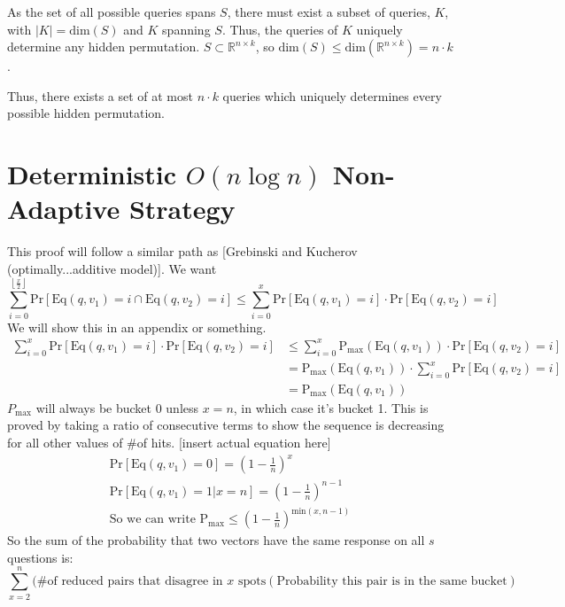 \documentclass[12pt, a4paper]{article}
\begin{document}
As the set of all possible queries spans $S$, there must exist a subset of queries,
$K$, with $|K|=\text{dim}(S)$ and $K$ spanning $S$. Thus, the queries of $K$ uniquely
determine any hidden permutation. $S\subset \mathbb{R}^{n\times k}$,
so $\text{dim}(S)\le \text{dim}(\mathbb{R}^{n\times k})=n\cdot k$.

Thus, there exists a set of at most $n\cdot k$ queries which uniquely determines every
possible hidden permutation.

\clearpage
\section*{Deterministic $O(n\log n)$ Non-Adaptive Strategy}
This proof will follow a similar path as [Grebinski and Kucherov
(optimally...additive model)].
We want 
	\begin{equation*}
	\sum_{i=0}^{\left\lfloor\frac{x}{2}\right\rfloor}\text{Pr}[\text{Eq}(q,v_1)=i
	\cap\text{Eq}(q,v_2) = i]\leq \sum_{i=0}^x\text{Pr}[\text{Eq}(q,v_1) = i]
	\cdot\text{Pr}[\text{Eq}(q,v_2) = i]
	\end{equation*}
We will show this in an appendix or something.
	\begin{align*}
	\sum_{i=0}^x\text{Pr}[\text{Eq}(q,v_1) = i]
	\cdot\text{Pr}[ \text{Eq}(q,v_2) = i]
	& \le \sum_{i=0}^x\text{P}_\text{max}(\text{Eq}(q,v_1))
	\cdot\text{Pr}[ \text{Eq}(q,v_2) = i] \\
	&= \text{P}_\text{max}(\text{Eq}(q,v_1))
	\cdot \sum_{i=0}^x\text{Pr}[ \text{Eq}(q,v_2) = i] \\
	&= \text{P}_\text{max}(\text{Eq}(q,v_1))
	\end{align*}
$P_\text{max}$ will always be bucket 0 unless $x=n$, in which case it's
bucket 1. This is proved by taking a ratio of consecutive terms to show the sequence
is decreasing for all other values of \#of hits. [insert actual equation here]
	\begin{align*}
	\text{Pr}[\text{Eq}(q,v_1) =0] = \left(1-\frac{1}{n}\right)^x \\
	\text{Pr}[\text{Eq}(q,v_1)=1 | x=n] = \left(1-\frac{1}{n}\right)^{n-1} \\
	\text{So we can write P$_\text{max}
	\leq \left(1-\frac{1}{n}\right)^{\text{min}(x,n-1)}$}
	\end{align*}
So the sum of the probability that two vectors have the same response on all $s$
questions is:
	\begin{equation*}
	\sum_{x=2}^n(\text{\# of reduced pairs that disagree in $x$ spots}
	(\text{Probability this pair is in the same bucket}) 
	\end{equation*}
	
\end{document}
